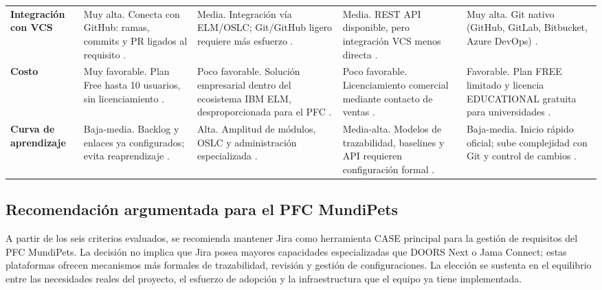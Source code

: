 \documentclass[journal,onecolumn]{IEEEtran}
\begin{document}
\begin{scriptsize}
\begin{longtable}{p{1.7cm} p{3.05cm} p{3.05cm} p{3.05cm} p{3.05cm}}
			\textbf{Integración con VCS} &
			Muy alta. Conecta con GitHub: ramas, commits y PR ligados al requisito
			\cite{atlassian_github_jira}. &
			Media. Integración vía ELM/OSLC; Git/GitHub ligero requiere más
			esfuerzo \cite{ibm_doors_overview}. &
			Media. REST API disponible, pero integración VCS menos directa
			\cite{jama_features}. &
			Muy alta. Git nativo (GitHub, GitLab, Bitbucket, Azure DevOps)
			\cite{reqview_git}. \\[3pt]
			
			\textbf{Costo} &
			Muy favorable. Plan Free hasta 10 usuarios, sin licenciamiento
			\cite{atlassian_jira_pricing}. &
			Poco favorable. Solución empresarial dentro del ecosistema IBM ELM,
			desproporcionada para el PFC \cite{ibm_doors_overview}. &
			Poco favorable. Licenciamiento comercial mediante contacto de ventas
			\cite{jama_pricing}. &
			Favorable. Plan FREE limitado y licencia EDUCATIONAL gratuita para
			universidades \cite{reqview_pricing}. \\[3pt]
			
			\textbf{Curva de aprendizaje} &
			Baja-media. Backlog y enlaces ya configurados; evita reaprendizaje
			\cite{atlassian_link_work_items,atlassian_jira_pricing}. &
			Alta. Amplitud de módulos, OSLC y administración especializada
			\cite{ibm_doors_overview,ibm_doors_oslc}. &
			Media-alta. Modelos de trazabilidad, baselines y API requieren
			configuración formal \cite{jama_features,jama_pricing}. &
			Baja-media. Inicio rápido oficial; sube complejidad con Git y
			control de cambios \cite{reqview_quickstart}. \\
			
		\end{longtable}
	\end{scriptsize}
	
	\subsection{Recomendación argumentada para el PFC MundiPets}
	\label{subsec:recomendacion-case}
	
	A partir de los seis criterios evaluados, se recomienda mantener Jira
	como herramienta CASE principal para la gestión de requisitos del PFC
	MundiPets. La decisión no implica que Jira posea mayores capacidades
	especializadas que DOORS Next o Jama Connect; estas plataformas
	ofrecen mecanismos más formales de trazabilidad, revisión y gestión de
	configuraciones. La elección se sustenta en el equilibrio entre las
	necesidades reales del proyecto, el esfuerzo de adopción y la
	infraestructura que el equipo ya tiene implementada.
	
\end{document}

